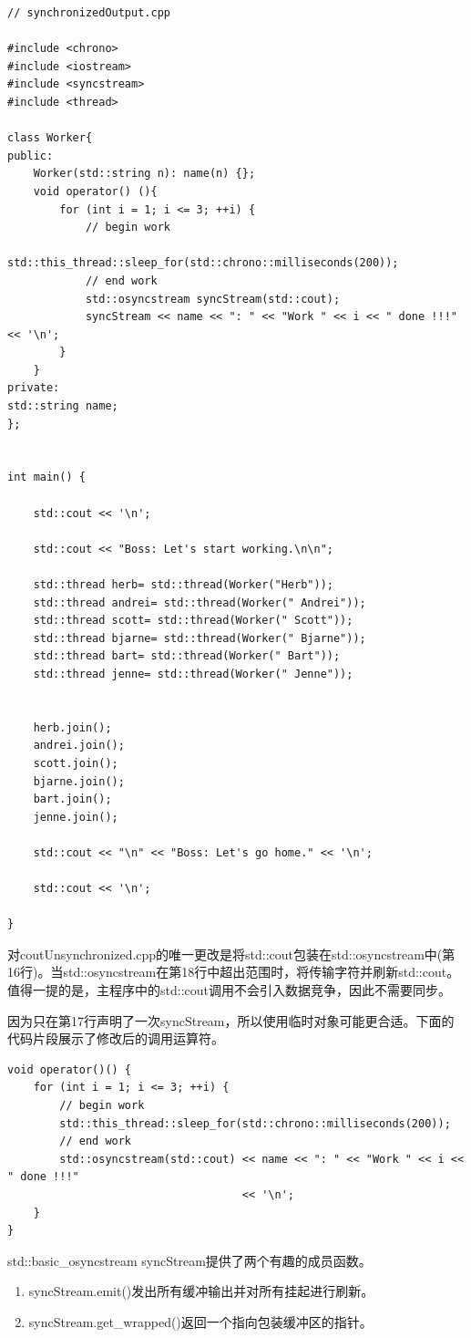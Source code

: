 \begin{lstlisting}[style=styleCXX]
// synchronizedOutput.cpp

#include <chrono>
#include <iostream>
#include <syncstream>
#include <thread>

class Worker{
public:
	Worker(std::string n): name(n) {};
	void operator() (){
		for (int i = 1; i <= 3; ++i) {
			// begin work
			std::this_thread::sleep_for(std::chrono::milliseconds(200));
			// end work
			std::osyncstream syncStream(std::cout);
			syncStream << name << ": " << "Work " << i << " done !!!" << '\n';
		}
	}
private:
std::string name;
};


int main() {

	std::cout << '\n';
	
	std::cout << "Boss: Let's start working.\n\n";
	
	std::thread herb= std::thread(Worker("Herb"));
	std::thread andrei= std::thread(Worker(" Andrei"));
	std::thread scott= std::thread(Worker(" Scott"));
	std::thread bjarne= std::thread(Worker(" Bjarne"));
	std::thread bart= std::thread(Worker(" Bart"));
	std::thread jenne= std::thread(Worker(" Jenne"));
	
	
	herb.join();
	andrei.join();
	scott.join();
	bjarne.join();
	bart.join();
	jenne.join();
	
	std::cout << "\n" << "Boss: Let's go home." << '\n';
	
	std::cout << '\n';

}
\end{lstlisting}

对coutUnsynchronized.cpp的唯一更改是将std::cout包装在std::osyncstream中(第16行)。当std::osyncstream在第18行中超出范围时，将传输字符并刷新std::cout。值得一提的是，主程序中的std::cout调用不会引入数据竞争，因此不需要同步。

因为只在第17行声明了一次syncStream，所以使用临时对象可能更合适。下面的代码片段展示了修改后的调用运算符。


\begin{lstlisting}[style=styleCXX]
void operator()() {
	for (int i = 1; i <= 3; ++i) {
		// begin work
		std::this_thread::sleep_for(std::chrono::milliseconds(200));
		// end work
		std::osyncstream(std::cout) << name << ": " << "Work " << i << " done !!!"
		                            << '\n';
	}
}
\end{lstlisting}

std::basic\_osyncstream syncStream提供了两个有趣的成员函数。

\begin{enumerate}
\item 
syncStream.emit()发出所有缓冲输出并对所有挂起进行刷新。

\item 
syncStream.get\_wrapped()返回一个指向包装缓冲区的指针。
\end{enumerate}

